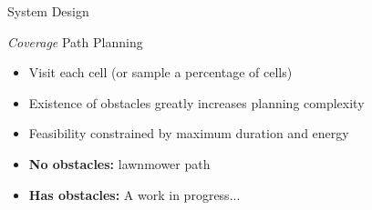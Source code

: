 \documentclass[9pt]{beamer}
\begin{document}
\begin{frame}{System Design}
    \begin{block}{\textit{Coverage} Path Planning}
	    \begin{itemize}
	        \item Visit each cell (or sample a percentage of cells)
	        \item Existence of obstacles greatly increases planning complexity
	        \item Feasibility constrained by maximum duration and energy
	        \item \textbf{No obstacles:} lawnmower path
	        \item \textbf{Has obstacles:} A work in progress... 
        \end{itemize}
    \end{block}


\end{frame}
\end{document}
